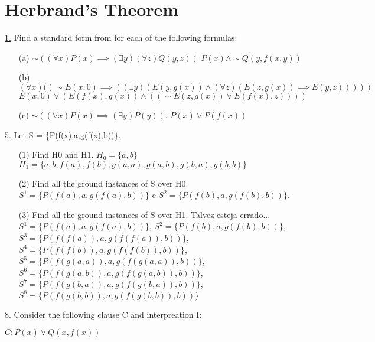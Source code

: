 \section{Herbrand's Theorem}

\underline{1.} Find a standard form from for each of the following formulas:
\begin{itemize}
 \item[(a)] $ \sim ((\forall x) P(x) \implies (\exists y) (\forall z) Q(y,z)) $ \newline
$ P(x) \wedge \sim Q(y, f(x, y)) $
 \item[(b)] $ (\forall x)((\sim E(x,0)\implies((\exists y)(E(y,g(x)) \wedge (\forall z)(E(z,g(x)) \implies E(y,z))))) $ \newline
$ E(x,0) \vee (E(f(x),g(x)) \wedge ( (\sim E(z,g(x)) \vee E(f(x),z))) )$
 \item[(c)] $ \sim((\forall x)P(x) \implies(\exists y)P(y)) $.
 \newline
$ P(x) \vee P(f(x)) $
\end{itemize}

\underline{5.} Let S = \{P(f(x),a,g(f(x),b))\}.
\begin{itemize}
 \item[(1)] Find H0 and H1. \newline
$ H_0 = \{ a, b \} $ \newline
$ H_1 = \{ a, b, f(a), f(b), g(a, a), g(a, b), g(b, a), g(b, b) \} $
 \item[(2)] Find all the ground instances of S over H0. \newline
$ S^1 = \{P(f(a),a,g(f(a),b))\} $ e $ S^2 = \{P(f(b),a,g(f(b),b))\} $.
 \item[(3)] Find all the ground instances of S over H1. \newline
Talvez esteja errado...\newline
$ S^1 = \{P(f(a),a,g(f(a),b))\} $, $ S^2 = \{P(f(b),a,g(f(b),b))\} $, $ S^3 = \{P(f(f(a)),a,g(f(f(a)),b))\} $, $ S^4 = \{P(f(f(b)),a,g(f(f(b)),b))\} $, $ S^5 = \{P(f(g(a,a)),a,g(f(g(a,a)),b))\} $, $ S^6 = \{P(f(g(a,b)),a,g(f(g(a,b)),b))\} $, $ S^7 = \{P(f(g(b,a)),a,g(f(g(b,a)),b))\} $, $ S^8 = \{P(f(g(b,b)),a,g(f(g(b,b)),b))\} $
\end{itemize}

8. Consider the following clause C and interpreation I:

$ C: P(x) \vee Q(x,f(x)) $

